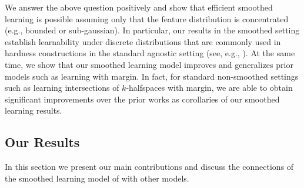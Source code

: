 \documentclass{theoretics}
\newcommand{\1}{\Ind}
\begin{document}
We answer the above question positively and show that efficient smoothed learning is possible assuming only that the feature distribution is concentrated (e.g., bounded or sub-gaussian). 
In particular, our results in the smoothed setting establish learnability under 
discrete distributions that are commonly used in hardness constructions in the standard 
agnostic setting (see, e.g., \cite{DanielyV21}).
At the same time, we show that our smoothed learning model improves and generalizes prior models such as learning with margin. In fact, for standard non-smoothed settings such as learning intersections of $k$-halfspaces with margin, we are able to obtain significant improvements over the prior works as corollaries of our smoothed learning results.
















\subsection{Our Results}
\label{sec:results}
In this section we present our main contributions and discuss the connections of the smoothed learning model of  with other models.
\end{document}
